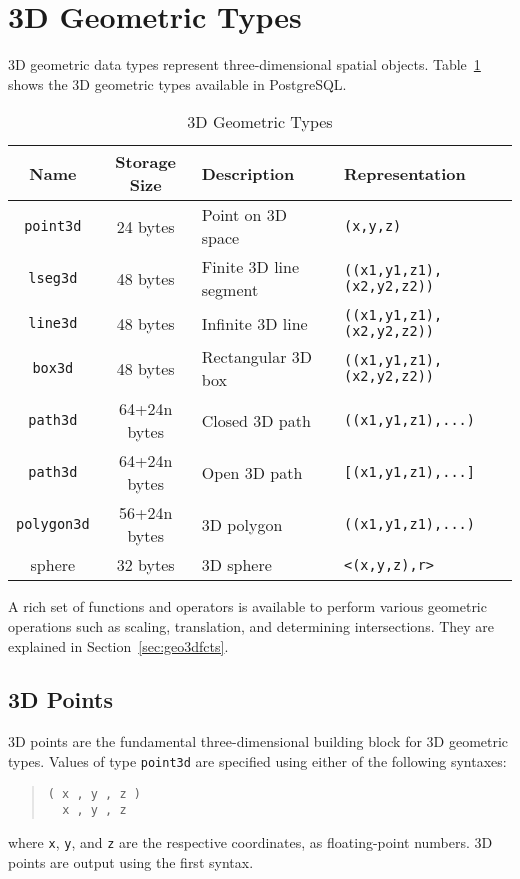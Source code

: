 \documentclass[10pt]{article}
\begin{document}
\section{3D Geometric Types}

3D geometric data types represent three-dimensional spatial objects. 
Table~\ref{tab:geo3dtypes} shows the 3D geometric types available in PostgreSQL.

\begin{table}[htb]
\centering
\caption{3D Geometric Types}
\label{tab:geo3dtypes}
\begin{tabular}{|c|c|p{4.5cm}|l|}\hline
Name & Storage Size & Description & Representation \\\hline\hline
\verb+point3d+ & 24 bytes & Point on 3D space & \verb+(x,y,z)+ \\
\verb+lseg3d+ & 48 bytes & Finite 3D line segment & \verb+((x1,y1,z1),(x2,y2,z2))+ \\
\verb+line3d+ & 48 bytes & Infinite 3D line & \verb+((x1,y1,z1),(x2,y2,z2))+ \\
\verb+box3d+ & 48 bytes & Rectangular 3D box & \verb+((x1,y1,z1),(x2,y2,z2))+ \\
\verb+path3d+ & 64+24n bytes & Closed 3D path & \verb+((x1,y1,z1),...)+ \\
\verb+path3d+ & 64+24n bytes & Open 3D path & \verb+[(x1,y1,z1),...]+ \\
\verb+polygon3d+ & 56+24n bytes & 3D polygon & \verb+((x1,y1,z1),...)+ \\
sphere & 32 bytes & 3D sphere & \verb+<(x,y,z),r>+\\\hline
\end{tabular}
\end{table}

A rich set of functions and operators is available to perform various geometric operations such as scaling, translation, and determining intersections. They are explained in Section~\ref{sec:geo3dfcts}.

\subsection{3D Points}

3D points are the fundamental three-dimensional building block for 3D geometric types. 
Values of type \verb+point3d+ are specified using either of the following syntaxes:
\begin{quote}
\begin{verbatim}
( x , y , z )
  x , y , z 
\end{verbatim}
\end{quote}
where \verb+x+, \verb+y+, and \verb+z+ are the respective coordinates, as floating-point numbers.
3D points are output using the first syntax.
\end{document}
